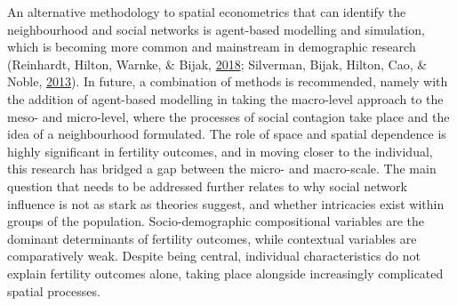 \documentclass[12pt,twoside]{reedthesis}
\begin{document}
An alternative methodology to spatial econometrics that can identify the neighbourhood and social networks is agent-based modelling and simulation, which is becoming more common and mainstream in demographic research (Reinhardt, Hilton, Warnke, \& Bijak, \protect\hyperlink{ref-reinhardt2018}{2018}; Silverman, Bijak, Hilton, Cao, \& Noble, \protect\hyperlink{ref-silverman2013}{2013}). In future, a combination of methods is recommended, namely with the addition of agent-based modelling in taking the macro-level approach to the meso- and micro-level, where the processes of social contagion take place and the idea of a neighbourhood formulated. The role of space and spatial dependence is highly significant in fertility outcomes, and in moving closer to the individual, this research has bridged a gap between the micro- and macro-scale. The main question that needs to be addressed further relates to why social network influence is not as stark as theories suggest, and whether intricacies exist within groups of the population. Socio-demographic compositional variables are the dominant determinants of fertility outcomes, while contextual variables are comparatively weak. Despite being central, individual characteristics do not explain fertility outcomes alone, taking place alongside increasingly complicated spatial processes.

\appendix
\end{document}
